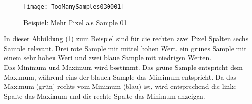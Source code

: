 \begin{figure}[ht]
	\centering
	\texttt{[image: TooManySamples030001]}
	\caption{Beispiel: Mehr Pixel als Sample 01}
	\label{fig:diagram3}
\end{figure}
In dieser Abbildung (\ref{fig:diagram3}) zum Beispiel sind für die rechten zwei Pixel Spalten sechs Sample relevant. Drei rote Sample mit mittel hohen Wert, ein grünes Sample mit einem sehr hohen Wert und zwei blaue Sample mit niedrigen Werten.\\
Das Minimum und Maximum wird bestimmt. Das grüne Sample entspricht dem Maximum, während eins der blauen Sample das Mimimum entspricht. Da das Maximum (grün) rechts vom Minimum (blau) ist, wird entsprechend die linke Spalte das Maximum und die rechte Spalte das Minimum anzeigen.\\